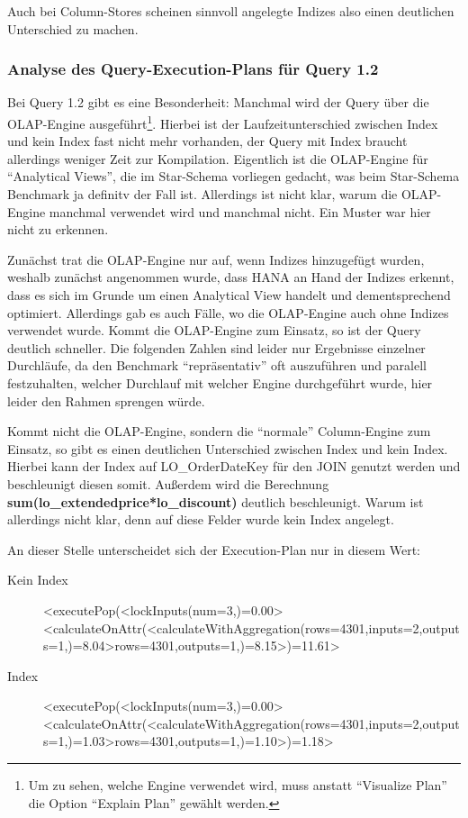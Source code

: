 Auch bei Column-Stores scheinen sinnvoll angelegte Indizes also einen deutlichen Unterschied zu machen.

\subsubsection{Analyse des Query-Execution-Plans für Query 1.2}
Bei Query 1.2 gibt es eine Besonderheit: Manchmal wird der Query über die OLAP-Engine ausgeführt\footnote{Um zu sehen, welche Engine verwendet wird, muss anstatt \enquote{Visualize Plan} die Option \enquote{Explain Plan} gewählt werden.}. 
Hierbei ist der Laufzeitunterschied zwischen Index und kein Index fast nicht mehr vorhanden, der Query mit Index braucht allerdings weniger Zeit zur Kompilation. 
Eigentlich ist die OLAP-Engine für \enquote{Analytical Views}, die im Star-Schema vorliegen gedacht, was beim Star-Schema Benchmark ja definitv der Fall ist.
Allerdings ist nicht klar, warum die OLAP-Engine manchmal verwendet wird und manchmal nicht. Ein Muster war hier nicht zu erkennen. 


Zunächst trat die OLAP-Engine nur auf, wenn Indizes hinzugefügt wurden, weshalb zunächst angenommen wurde, dass HANA an Hand der Indizes erkennt, dass es sich im Grunde um einen Analytical View handelt und dementsprechend optimiert.
Allerdings gab es auch Fälle, wo die OLAP-Engine auch ohne Indizes verwendet wurde. Kommt die OLAP-Engine zum Einsatz, so ist der Query deutlich schneller. Die folgenden Zahlen sind leider nur Ergebnisse einzelner Durchläufe, 
da den Benchmark \enquote{repräsentativ} oft auszuführen und paralell festzuhalten, welcher Durchlauf mit welcher Engine durchgeführt wurde, hier leider den Rahmen sprengen würde.

Kommt nicht die OLAP-Engine, sondern die \enquote{normale} Column-Engine zum Einsatz, so gibt es einen deutlichen Unterschied zwischen Index und kein Index. Hierbei kann der Index auf LO\_OrderDateKey für den JOIN genutzt werden und beschleunigt diesen somit.
Außerdem wird die Berechnung \textbf{sum(lo\_extendedprice*lo\_discount)} deutlich beschleunigt. Warum ist allerdings nicht klar, denn auf diese Felder wurde kein Index angelegt.

An dieser Stelle unterscheidet sich der Execution-Plan nur in diesem Wert:
\begin{description}
    \item[Kein Index] <executePop(<lockInputs(num=3,)=0.00><calculateOnAttr(<calculateWithAggregation(rows=4301,inputs=2,outputs=1,)=8.04>rows=4301,outputs=1,)=8.15>)=11.61>
    \item[Index]      <executePop(<lockInputs(num=3,)=0.00><calculateOnAttr(<calculateWithAggregation(rows=4301,inputs=2,outputs=1,)=1.03>rows=4301,outputs=1,)=1.10>)=1.18>
\end{description}

